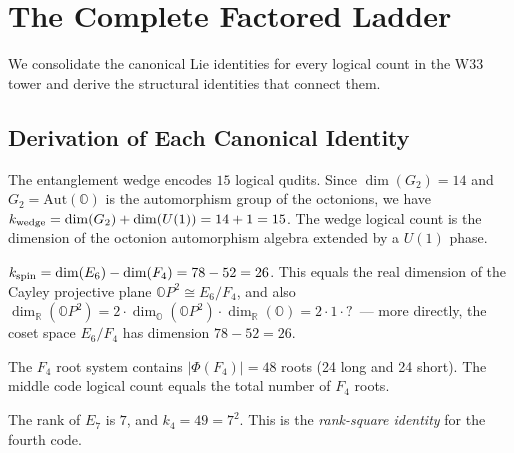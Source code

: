 
\section{The Complete Factored Ladder}\label{sec:ladder}

We consolidate the canonical Lie identities for every logical count
in the W33 tower and derive the structural identities that connect them.

\subsection{Derivation of Each Canonical Identity}

\begin{proposition}[Wedge: $k_{\rm wedge} = 15 = \dim(G_2 \times U(1))$]
The entanglement wedge encodes $15$ logical qudits.
Since $\dim(G_2) = 14$ and $G_2 = \mathrm{Aut}(\mathbb{O})$
is the automorphism group of the octonions, we have
$k_{\rm wedge} = \dim(G_2) + \dim(U(1)) = 14 + 1 = 15$.
The wedge logical count is the dimension of the
octonion automorphism algebra extended by a $U(1)$ phase.
\end{proposition}

\begin{proposition}[Spinor: $k_{\rm spin} = 26 = \dim_{\mathbb{R}}(\mathbb{O}P^2)$]
$k_{\rm spin} = \dim(E_6) - \dim(F_4) = 78 - 52 = 26$.
This equals the real dimension of the Cayley projective plane
$\mathbb{O}P^2 \cong E_6 / F_4$,
and also $\dim_{\mathbb{R}}(\mathbb{O}P^2) = 2 \cdot \dim_{\mathbb{O}}(\mathbb{O}P^2)
\cdot \dim_{\mathbb{R}}(\mathbb{O}) = 2 \cdot 1 \cdot ?$\ ---
more directly, the coset space $E_6/F_4$ has dimension $78-52=26$.
\end{proposition}

\begin{proposition}[Middle: $k_M = 48 = |\Phi(F_4)|$]
The $F_4$ root system contains $|\Phi(F_4)| = 48$ roots
(24 long and 24 short).
The middle code logical count equals the total number of $F_4$ roots.
\end{proposition}

\begin{proposition}[Fourth: $k_4 = 49 = \mathrm{rank}(E_7)^2 = 7^2$]
The rank of $E_7$ is $7$, and $k_4 = 49 = 7^2$.
This is the \emph{rank-square identity} for the fourth code.
\end{proposition}

